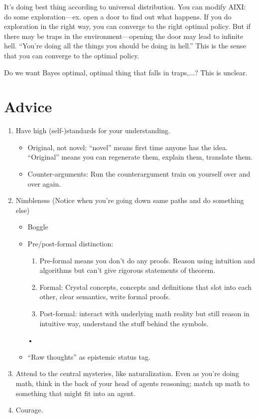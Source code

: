 \documentclass[11pt]{article}
\begin{document}
It's doing best thing according to universal distribution. You can modify AIXI: do some exploration---ex. open a door to find out what happens. If you do exploration in the right way, you can converge to the right optimal policy. %
But if there may be traps in the environment---opening the door may lead to infinite hell. ``You're doing all the things you should be doing in hell.'' This is the sense that you can converge to the optimal policy.

Do we want Bayes optimal, optimal thing that falls in traps,...? This is unclear.





\section{Advice}

\begin{enumerate}
\item
Have high (self-)standards for your understanding.
\begin{itemize}
\item
Original, not novel: ``novel'' means first time anyone has the idea. ``Original'' means you can regenerate them, explain them, translate them.
\item
Counter-arguments: Run the counterargument train on yourself over and over again.
\end{itemize}
\item
Nimbleness  (Notice when you're going down same paths and do something else)
\begin{itemize}
\item
Boggle
\item
Pre/post-formal distinction: 
\begin{enumerate}
\item
Pre-formal means you don't do any proofs. Reason using intuition and algorithms but can't give rigorous statements of theorem. 
\item
Formal: Crystal concepts, concepts and definitions that slot into each other, clear semantics, write formal proofs. 
\item 
Post-formal: interact with underlying math reality but still reason in intuitive way, understand the stuff behind the symbols. 
\end{enumerate}•
\item ``Raw thoughts'' as epistemic status tag.
\end{itemize}
\item
Attend to the central mysteries, like naturalization.
Even as you're doing math, think in the back of your head of agents reasoning; match up math to something that might fit into an agent.
\item
Courage.
\end{enumerate}


\end{document}
